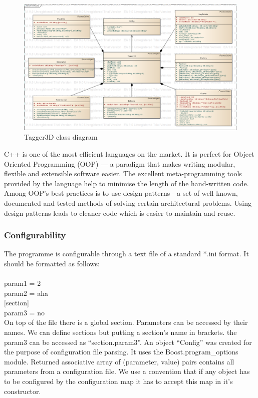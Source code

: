 	\begin{figure}[ht]
	\centering
	\includegraphics[width=1.0\textwidth]{../figs/class}
	\caption{Tagger3D class diagram}
	\label{fig:class_diagram}
	\end{figure}
	
	C++ is one of the most efficient languages on the market. It is perfect for Object Oriented Programming (OOP) --- a paradigm that makes writing modular, flexible and extensible software easier. The excellent meta-programming tools provided by the language help to minimise the length of the hand-written code. Among OOP's best practices is to use design patterns - a set of well-known, documented and tested methods of solving certain architectural problems. Using design patterns leads to cleaner code which is easier to maintain and reuse. 
	
	\subsubsection{Configurability}
	The programme is configurable through a text file of a standard *.ini format. It should be formatted as follows:\\ \ \\
	 param1 = 2\\
	 param2 = aha\\
	 {[section]}\\
	 param3 = no\\
	
	On top of the file there is a global section. Parameters can be accessed by their names. We can define sections but putting a section's name in brackets. the param3 can be accessed as ``section.param3''. An object ``Config'' was created for the purpose of configuration file parsing. It uses the Boost.program\_options module. Returned associative array of (parameter, value) pairs contains all parameters from a configuration file. We use a convention that if any object has to be configured by the configuration map it has to accept this map in it's constructor.
	
